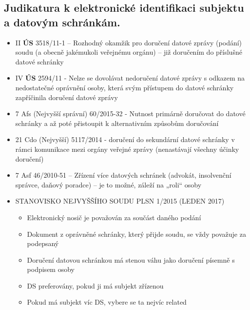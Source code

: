 \subsection{Judikatura k elektronické identifikaci subjektu a datovým schránkám.}
\begin{itemize}
    \item II \textbf{ÚS} 3518/11-1 – Rozhodný okamžik pro doručení datové zprávy (podání) soudu (a obecně jakémukoli veřejnému orgánu) – již doručením do příslušné datové schránky
    \item IV \textbf{ÚS} 2594/11 - Nelze se dovolávat nedoručení datové zprávy s odkazem na nedostatečné oprávnění osoby, která svým přístupem do datové schránky zapříčinila doručení datové zprávy
    \item 7 Afs (Nejvyšší správní) 60/2015-32 - Nutnost primárně doručovat do datové schránky a až poté přistoupit k alternativním způsobům doručování
    \item 21 Cdo (Nejvyšší) 5117/2014 - doručení do sekundární datové schránky v rámci komunikace mezi orgány veřejné zprávy (nenastávají všechny účinky doručení)
    \item 7 Asf 46/2010-51 – Zřízení více datových schránek (advokát, insolvenční správce, daňový poradce) – je to možné, záleží na „roli“ osoby
    \item STANOVISKO NEJVYŠŠÍHO SOUDU PLSN 1/2015 (LEDEN 2017)
    \begin{itemize}
        \item Elektronický nosič je považován za součást daného podání
        \item Dokument z oprávněné schránky, který přijde soudu, se vždy považuje za podepsaný
        \item Doručení datovou schránkou má stenou váhu jako doručení písemně s podpisem osoby
        \item DS preferovány, pokud ji má subjekt zřízenou
        \item Pokud má subjekt víc DS, vybere se ta nejvíc related
    \end{itemize}
\end{itemize}
